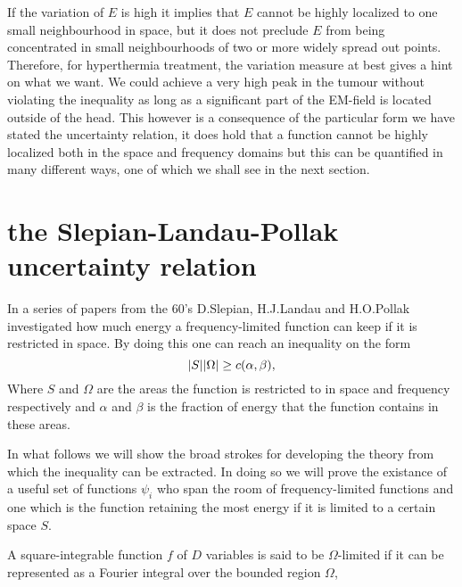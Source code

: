 \documentclass[11pt,a4paper, 
english, swedish %
]{article}
\begin{document}
If the variation of $E$ is high it implies that $E$ cannot be highly localized to one small neighbourhood in space, but it does not preclude $E$ from being concentrated in small neighbourhoods of two or more widely spread out points. Therefore, for hyperthermia treatment, the variation measure at best gives a hint on what we want. We could achieve a very high peak in the tumour without violating the inequality as long as a significant part of the EM-field is located outside of the head.
This however is a consequence of the particular form we have stated the uncertainty relation, it does hold that a function cannot be highly localized both in the space and frequency domains but this can be quantified in many different ways, one of which we shall see in the next section.

\section{the Slepian-Landau-Pollak uncertainty relation}
In a series of papers from the 60's D.Slepian, H.J.Landau and H.O.Pollak investigated how much energy a frequency-limited function can keep if it is restricted in space. By doing this one can reach an inequality on the form
\begin{equation}
\abs{S}\abs{\Omega} \geq c(\alpha,\beta),
\end{equation}
Where $S$ and $\Omega$ are the areas the function is restricted to in space and frequency respectively and $\alpha$ and $\beta$ is the fraction of energy that the function contains in these areas. 

In what follows we will show the broad strokes for developing the theory from which the inequality can be extracted. In doing so we will prove the existance of a useful set of functions ${\psi_i}$ who span the room of frequency-limited functions and one which is the function retaining the most energy if it is limited to a certain space $S$.

A square-integrable function $f$ of $D$ variables is said to be $\Omega$-limited if it can be represented as a Fourier integral over the bounded region $\Omega$,
\end{document}

